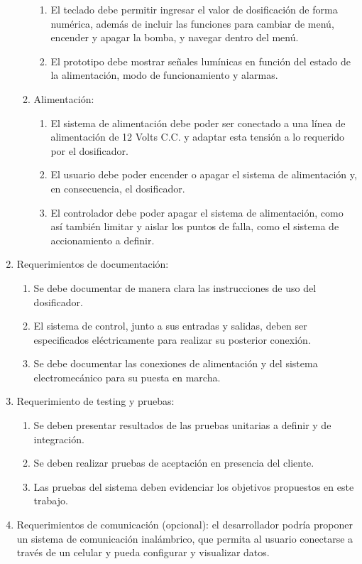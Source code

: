 \documentclass[
11pt, %
]{charter}
\begin{document}
\begin{enumerate}
\begin{enumerate}
\begin{enumerate}
			\item El teclado debe permitir ingresar el valor de dosificación de forma numérica, además de incluir las funciones para cambiar de menú, encender y apagar la bomba, y navegar dentro del menú.
			\item El prototipo debe mostrar señales lumínicas en función del estado de la alimentación, modo de funcionamiento y alarmas.
			\end{enumerate}
			\item Alimentación:
			\begin{enumerate}
			\item El sistema de alimentación debe poder ser conectado a una línea de alimentación de 12 Volts C.C. y adaptar esta tensión a lo requerido por el dosificador.
			\item El usuario debe poder encender o apagar el sistema de alimentación y, en consecuencia, el dosificador.
			\item El controlador debe poder apagar el sistema de alimentación, como así también limitar y aislar los puntos de falla, como el sistema de accionamiento a definir.
			\end{enumerate}
		\end{enumerate}
		
	\item Requerimientos de documentación:
		\begin{enumerate}
			\item Se debe documentar de manera clara las instrucciones de uso del dosificador.
			\item El sistema de control, junto a sus entradas y salidas, deben ser especificados eléctricamente para realizar su posterior conexión.
			\item Se debe documentar las conexiones de alimentación y del sistema electromecánico para su puesta en marcha.
		\end{enumerate}
		
	\item Requerimiento de testing y pruebas:
		\begin{enumerate}
			\item Se deben presentar resultados de las pruebas unitarias a definir y de integración.
			\item Se deben realizar pruebas de aceptación en presencia del cliente.
			\item Las pruebas del sistema deben evidenciar los objetivos propuestos en este trabajo.
		\end{enumerate}
		
	\item Requerimientos de comunicación (opcional): el desarrollador podría proponer un sistema de comunicación inalámbrico, que permita al usuario conectarse a través de un celular y pueda configurar y visualizar datos.
\end{enumerate}
\end{document}

